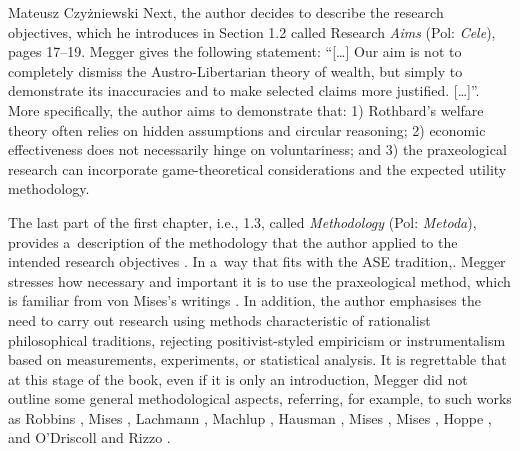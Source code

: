 \begin{newrevengenv}{Mateusz Czyżniewski}
Next, the author decides to describe the research objectives, which he introduces in Section 1.2 called Research \textit{Aims} (Pol: \textit{Cele}), pages 17–19. Megger gives the following statement: ``[…] Our aim is not to completely dismiss the Austro-Libertarian theory of wealth, but simply to demonstrate its inaccuracies and to make selected claims more justified. […]''. More specifically, the author aims to demonstrate that: 1) Rothbard's welfare theory often relies on hidden assumptions and circular reasoning; 2) economic effectiveness does not necessarily hinge on voluntariness; and 3) the praxeological research can incorporate game-theoretical considerations and the expected utility methodology.



The last part of the first chapter, i.e., 1.3, called \textit{Methodology} (Pol: \textit{Metoda}), provides a~description of the methodology that the author applied to the intended research objectives 
\parencite[][pp.19–24]{megger_sprawiedliwosc_2021}. %
 In a~way that fits with the ASE tradition,. Megger stresses how necessary and important it is to use the praxeological method, which is familiar from von Mises's writings 
\parencites*[][]{mises_theory_1997}[][]{mises_human_1998}. %
 In addition, the author emphasises the need to carry out research using methods characteristic of rationalist philosophical traditions, rejecting positivist-styled empiricism or instrumentalism based on measurements, experiments, or statistical analysis. It is regrettable that at this stage of the book, even if it is only an introduction, Megger did not outline some general methodological aspects, referring, for example, to such works as Robbins 
\parencite*[][]{robbins_essay_1932}, %
 Mises 
\parencite*[][]{mises_ultimate_1962}, %
 Lachmann 
\parencite*[][]{lachmann_legacy_1971}, %
 Machlup 
\parencite*[][]{machlup_methodology_1978}, %
 Hausman 
\parencite*[][]{hausman_impossibility_1995}, %
 Mises 
\parencite*[][]{mises_theory_1997}, %
 Mises 
\parencite*[][]{mises_human_1998}, %
 Hoppe 
\parencite*[][]{hoppe_economics_2006}, %
 and O'Driscoll and Rizzo 
\parencite*[][]{odriscoll_austrian_2014}.%





\end{newrevengenv}
